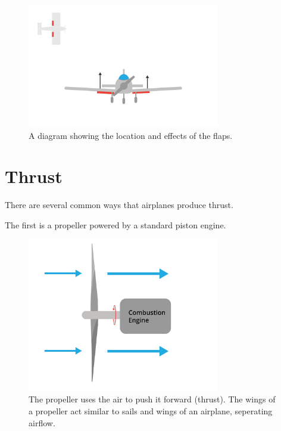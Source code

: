 \begin{figure}[htbp]
    \centering
    \includegraphics[width=0.75\textwidth]{flaps.png}
    \caption{A diagram showing the location and effects of the flaps.}
    \label{fig:flaps}
\end{figure}
    


\section{Thrust}

There are several common ways that airplanes produce thrust.

The first is a propeller powered by a standard piston engine.
\begin{figure}[htbp]
    \centering
    \includegraphics[width=0.75\textwidth]{propeller.png}
    \caption{The propeller uses the air to push it forward (thrust). The wings of a propeller act similar to sails and wings of an airplane, seperating airflow.}
    \label{fig:propeller}
\end{figure}



